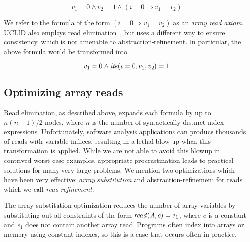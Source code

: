 \[v_1 = 0 \wedge v_2 = 1 \wedge (i = 0 \Rightarrow v_1 = v_2) \]

We refer to the formula of the form $(i = 0 \Rightarrow v_1 = v_2)$ as
an {\it array read axiom}. UCLID also employs read
elimination~\cite{uclid}, but uses a different way to ensure
consistency, which is not amenable to abstraction-refinement. In
particular, the above formula would be transformed into

\[v_1 = 0 \wedge {\it ite}(i=0,v_1,v_2) = 1 \]





\subsection{Optimizing array reads}

Read elimination, as described above, expands each formula by up to
$n(n-1)/2$ nodes, where $n$ is the number of syntactically distinct
index expressions. Unfortunately, software analysis applications can
produce thousands of reads with variable indices, resulting in a
lethal blow-up when this transformation is applied.  While we are not
able to avoid this blowup in contrived worst-case examples,
appropriate procrastination leads to practical solutions for many very
large problems. We mention two optimizations which have been very
effective: {\it array substitution} and abstraction-refinement for
reads which we call {\it read refinement}.


The array substitution optimization reduces the number of array
variables by substituting out all constraints of the form ${\it read}(A,
c) = e_1$, where $c$ is a constant and $e_1$ does not contain another
array read.  Programs often index into arrays or memory using constant
indexes, so this is a case that occurs often in practice.

